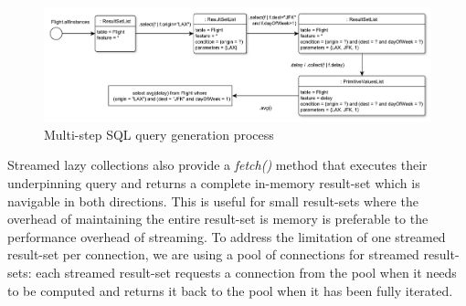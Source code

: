 \begin{figure}
 \centering
		\includegraphics[width=\textwidth]{images/query.pdf}
	\caption{Multi-step SQL query generation process}
	\label{fig:query}
\end{figure}

Streamed lazy collections also provide a \emph{fetch()} method that executes their underpinning query and returns a complete in-memory result-set which is navigable in both directions. This is useful for small result-sets where the overhead of maintaining the entire result-set is memory is preferable to the performance overhead of streaming. To address the limitation of one streamed result-set per connection, we are using a pool of connections for streamed result-sets: each streamed result-set requests a connection from the pool when it needs to be computed and returns it back to the pool when it has been fully iterated.



